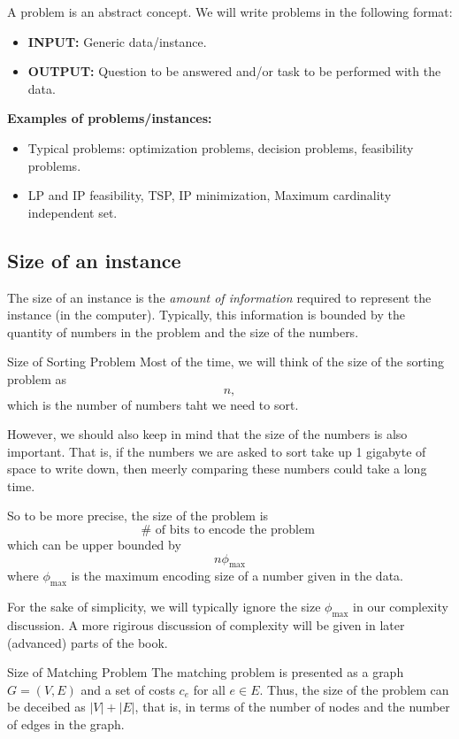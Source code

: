 A problem is an abstract concept. We will write problems in the following format:
\begin{itemize}
	\item {\bf INPUT:} Generic data/instance.
	\item {\bf OUTPUT:} Question to be answered and/or task to be performed with the data.
\end{itemize}

{\bf Examples of problems/instances:}
	\begin{itemize}
	  \item Typical problems: optimization problems, decision problems, feasibility problems.
		\item LP and IP feasibility, TSP, IP minimization, Maximum cardinality independent set.
	\end{itemize}
	
	\subsection{Size of an instance}
	
The size of an instance is the {\em amount of information} required to represent the instance (in the computer).	Typically, this information is bounded by the quantity of numbers in the problem and the size of the numbers.

\begin{example}{Size of Sorting Problem}{}
Most of the time, we will think of the size of the sorting problem as 
$$
n,
$$
which is the number of numbers taht we need to sort.

However, we should also keep in mind that the size of the numbers is also important.  That is, if the numbers we are asked to sort take up 1 gigabyte of space to write down, then meerly comparing these numbers could take a long time. 

So to be more precise, the size of the problem is
$$
\# \text{ of bits to encode the problem }
$$
which can be upper bounded by 
$$
n \phi_{\max}
$$
where $\phi_{\max}$ is the maximum encoding size of a number given in the data.

For the sake of simplicity, we will typically ignore the size $\phi_{\max}$ in our complexity discussion.  A more rigirous discussion of complexity will be given in later (advanced) parts of the book.
\end{example}

\begin{example}{Size of Matching Problem}{}
The matching problem is presented as a graph $G= (V,E)$ and a set of costs $c_e$ for all $e \in E$.  Thus, the size of the problem can be deceibed as $|V| + |E|$, that is, in terms of the number of nodes and the number of edges in the graph.

\end{example}

